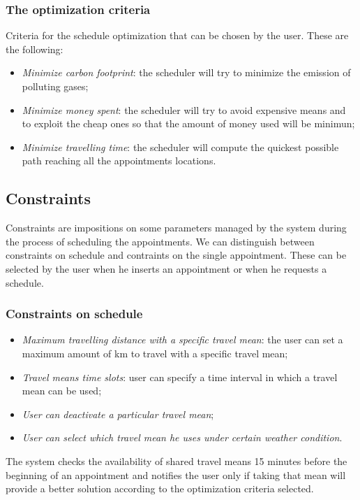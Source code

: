  
\subsubsection{The optimization criteria} \label{subsubsect:optcriteria} 
Criteria for the schedule optimization that can be chosen by the user. These are the following:
\begin{itemize}
\item \textit{Minimize carbon footprint}: the scheduler will try to minimize the emission of polluting gases;
\item \textit{Minimize money spent}: the scheduler will try to avoid expensive means and to exploit the cheap ones so that the amount of money used will be minimun;
\item \textit{Minimize travelling time}: the scheduler will compute the quickest possible path reaching all the appointments locations.
\end{itemize}

\subsection{Constraints}
Constraints are impositions on some parameters managed by the system during the process of scheduling the appointments. We can distinguish between constraints on schedule and contraints on the single appointment. These can be selected by the user when he inserts an appointment or when he requests a schedule. 

\subsubsection{Constraints on schedule} \label{subsect:constraintSchedule}
\begin{itemize}
\item \textit{Maximum travelling distance with a specific travel mean}: the user can set a maximum amount of km to travel with a specific travel mean;
\item\textit{ Travel means time slots}: user can specify a time interval in which a travel mean can be used;
\item \textit{User can deactivate a particular travel mean};
\item \textit{User can select which travel mean he uses under certain weather condition}.
\end{itemize}

The system checks the availability of shared travel means 15 minutes before the beginning of an appointment and notifies the user only if taking that mean will provide a better solution according to the optimization criteria selected.

